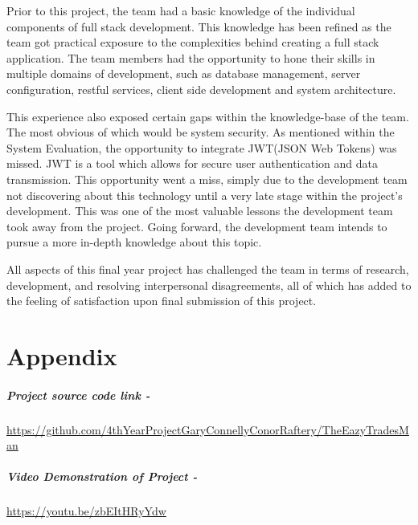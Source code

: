 \bigskip

Prior to this project, the team had a basic knowledge of the individual components of full stack development. This knowledge has been refined as the team got practical exposure to the complexities behind creating a full stack application. The team members had the opportunity to hone their skills in multiple domains of development, such as database management, server configuration, restful services, client side development and system architecture.

\bigskip

This experience also exposed certain gaps within the knowledge-base of the team. The most obvious of which would be system security. As mentioned within the System Evaluation, the opportunity to integrate JWT(JSON Web Tokens) was missed. JWT is a tool which allows for secure user authentication and data transmission. This opportunity went a miss, simply due to the development team not discovering about this technology until a very late stage within the project's development. This was one of the most valuable lessons the development team took away from the project. Going forward, the development team intends to pursue a more in-depth knowledge about this topic.

\bigskip

All aspects of this final year project has challenged the team in terms of research, development, and resolving interpersonal disagreements, all of which has added to the feeling of satisfaction upon final submission of this project.


\chapter{Appendix}

\paragraph{Project source code link - \newline}
\bigskip

\href{https://github.com/4thYearProjectGaryConnellyConorRaftery/TheEazyTradesMan}{https://github.com/4thYearProjectGaryConnellyConorRaftery/TheEazyTradesMan}

\bigskip

\paragraph{Video Demonstration of Project - \newline}

\bigskip

\href{https://youtu.be/zbEItHRyYdw}{https://youtu.be/zbEItHRyYdw}

%

